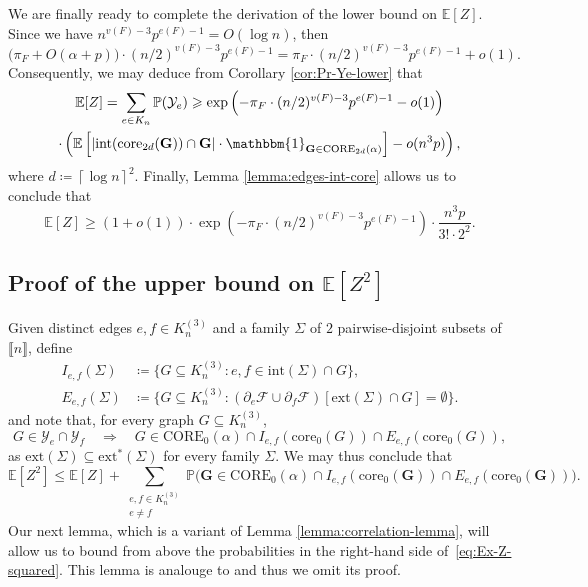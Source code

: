\documentclass[11pt,a4paper,oneside,reqno]{amsart}
\newcommand{\bG}{\mathbf{G}}
\newcommand{\cF}{\mathcal{F}}
\newcommand{\cY}{\mathcal{Y}}
\renewcommand{\Pr}{\mathbb{P}}
\newcommand{\Ex}{\mathbb{E}}
\newcommand{\1}{\mathbbm{1}} %
\newcommand{\br}[1]{\llbracket{#1}\rrbracket}
\renewcommand{\le}{\leqslant}
\renewcommand{\ge}{\geqslant}
\newcommand{\ext}{\mathrm{ext}}
\renewcommand{\int}{\mathrm{int}}
\newcommand{\core}{\mathrm{core}}
\newcommand{\Core}{\mathrm{CORE}}
\begin{document}
We are finally ready to complete the derivation of the lower bound on $\Ex[Z]$.
Since we have $n^{v(F)-3}p^{e(F)-1} = O(\log n)$, then
\[
  \big(\pi_F + O(\alpha+p)\big) \cdot (n/2)^{v(F)-3}p^{e(F)-1} = \pi_F \cdot (n/2)^{v(F)-3} p^{e(F)-1} + o(1).
\]
Consequently, we may deduce from Corollary \ref{cor:Pr-Ye-lower} that
\begin{multline*}
  \Ex[Z] = \sum_{e \in K_n} \Pr(\cY_e) \ge \exp\left(-\pi_F \cdot (n/2)^{v(F)-3} p^{e(F)-1} - o(1)\right) \\
  \cdot \left(\Ex\left[\left|\int(\core_{2d}(\bG)) \cap \bG \right| \cdot \1_{\bG \in \Core_{2d}(\alpha)}\right]-o(n^3 p)\right),
\end{multline*}
where $d \coloneqq \left\lceil \log n\right\rceil^2$.
Finally, Lemma \ref{lemma:edges-int-core} allows us to conclude that
\begin{equation}
  \label{eq:Ex-Z-lower}
  \Ex[Z] \ge (1+o(1)) \cdot \exp\left(-\pi_F \cdot (n/2)^{v(F)-3} p^{e(F)-1}\right) \cdot \frac{n^3 p}{3! \cdot 2^2}.
\end{equation}

\subsection{Proof of the upper bound on $\Ex[Z^2]$}
\label{sec:proof-upper-bound-Z}

Given distinct edges $e, f \in K_n^{(3)}$ and a family $\Sigma$ of $2$ pairwise-disjoint subsets of $\br{n}$, define
\begin{align*}
  I_{e,f}(\Sigma) & \coloneqq \big\{G \subseteq K_n^{(3)} : e,f \in \int(\Sigma) \cap G\big\}, \\
  E_{e,f}(\Sigma) & \coloneqq \big\{G \subseteq K_n^{(3)} : \left(\partial_e\cF \cup \partial_f\cF\right)[\ext(\Sigma) \cap G] = \emptyset\big\}.
\end{align*}
and note that, for every graph $G \subseteq K_n^{(3)}$,
\[
  G \in \cY_e \cap \cY_f \quad \Longrightarrow \quad G \in \Core_0(\alpha) \cap I_{e,f}(\core_0(G)) \cap E_{e,f}(\core_0(G)),
\]
as $\ext(\Sigma) \subseteq \ext^*(\Sigma)$ for every family $\Sigma$.  We may thus conclude that
\begin{equation}
  \label{eq:Ex-Z-squared}
  \Ex[Z^2] \le \Ex[Z] + \sum_{\substack{e, f \in K_n^{(3)} \\ e \neq f}} \Pr\big(\bG \in \Core_0(\alpha) \cap I_{e,f}(\core_0(\bG)) \cap E_{e,f}(\core_0(\bG))\big).
\end{equation}
Our next lemma, which is a variant of Lemma \ref{lemma:correlation-lemma}, will allow us to bound from above the probabilities in the right-hand side of~\eqref{eq:Ex-Z-squared}. This lemma is analouge to \cite[Lemma 4.8]{hoshen2023simonovits} and thus we omit its proof.
\end{document}
